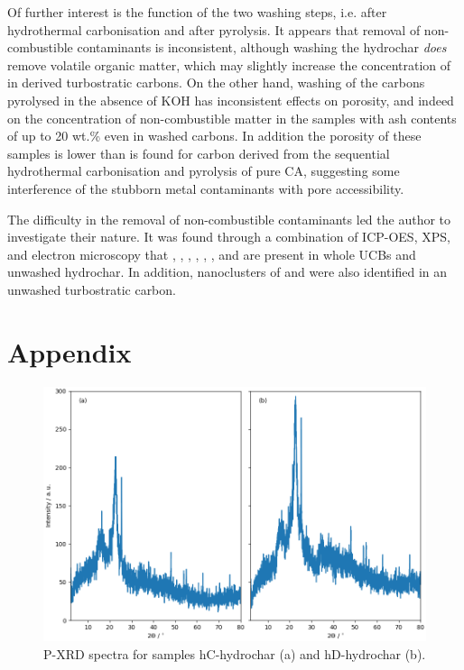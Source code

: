 Of further interest is the function of the two washing steps, i.e. after hydrothermal carbonisation and after pyrolysis. It appears that removal of non-combustible contaminants is inconsistent, although washing the hydrochar \textit{does} remove volatile organic matter, which may slightly increase the concentration of  in derived turbostratic carbons. On the other hand, washing of the carbons pyrolysed in the absence of KOH has inconsistent effects on porosity, and indeed on the concentration of non-combustible matter in the samples with ash contents of up to 20 wt.\% even in washed carbons. In addition the porosity of these samples is lower than is found for carbon derived from the sequential hydrothermal carbonisation and pyrolysis of pure CA, suggesting some interference of the stubborn metal contaminants with pore accessibility.

The difficulty in the removal of non-combustible contaminants led the author to investigate their nature. It was found through a combination of ICP-OES, XPS, and electron microscopy that , , , , , , and  are present in whole UCBs and unwashed hydrochar. In addition, nanoclusters of  and  were also identified in an unwashed turbostratic carbon. 




\newpage
\section*{Appendix}
\appnums


\begin{figure}[h]
    \centering
    \includegraphics[width=\columnwidth, keepaspectratio]{4-cbs/figs/xrd_hydrochar.png}
    \caption{P-XRD spectra for samples hC-hydrochar (a) and hD-hydrochar (b).}
    \label{fig:xrd_hydrochar}
\end{figure}

